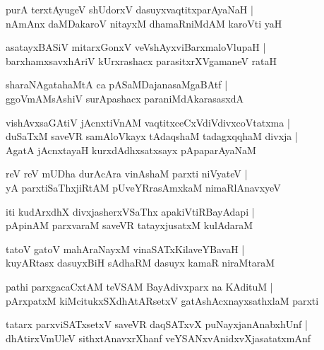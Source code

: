 \begin{shloka}
purA terxtAyugeV shUdorxV dasuyxvaqtitxparAyaNaH |\\
nAmAnx daMDakaroV nitayxM dhamaRniMdAM karoVti yaH 
\end{shloka}

\begin{shloka}
asatayxBASiV mitarxGonxV veVshAyxviBarxmaloVlupaH |\\
barxhamxsavxhAriV kUrxrashacx parasitxrXVgamaneV rataH
\end{shloka}

\begin{shloka}
sharaNAgatahaMtA ca pASaMDajanasaMgaBAtf |\\
ggoVmAMsAshiV surApashacx paraniMdAkarasasxdA
\end{shloka}

\begin{shloka}
vishAvxsaGAtiV jAcnxtiVnAM vaqtitxceCxVdiVdivxcoVtatxma |\\
duSaTxM saveVR samAloVkayx tAdaqshaM tadagxqqhaM divxja |\\
AgatA jAcnxtayaH kurxdAdhxsatxsayx pApaparAyaNaM
\end{shloka}

\begin{shloka}
reV reV mUDha durAcAra vinAshaM parxti niVyateV |\\
yA parxtiSaThxjiRtAM pUveYRrasAmxkaM nimaRlAnavxyeV 
\end{shloka}

\begin{shloka}
iti kudArxdhX divxjasherxVSaThx apakiVtiRBayAdapi |\\
pApinAM parxvaraM saveVR tatayxjusatxM kulAdaraM
\end{shloka}

\begin{shloka}
tatoV gatoV mahAraNayxM vinaSATxKilaveYBavaH |\\
kuyARtasx dasuyxBiH sAdhaRM dasuyx kamaR niraMtaraM 
\end{shloka}

\begin{shloka}
pathi parxgacaCxtAM teVSAM BayAdivxparx na KAdituM |\\
pArxpatxM kiMcitukxSXdhAtARsetxV gatAshAcxnayxsathxlaM parxti
\end{shloka}

\begin{shloka}
tatarx parxviSATxsetxV saveVR daqSATxvX puNayxjanAnabxhUnf |\\
dhAtirxVmUleV sithxtAnavxrXhanf veYSANxvAnidxvXjasatatxmAnf
\end{shloka}

